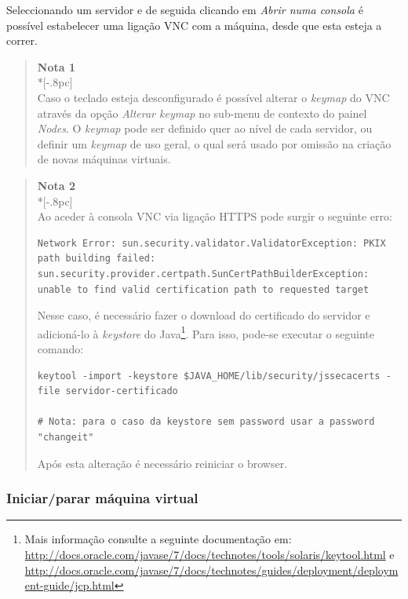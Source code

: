 Seleccionando um servidor e de seguida clicando em \emph{Abrir numa consola} é possível estabelecer uma ligação VNC com a máquina, desde que esta esteja a correr.

\begin{quote}
	{\large \bf Nota 1} \\*[-.8pc]
	\underline{\hspace{6in}} \\
	Caso o teclado esteja desconfigurado é possível alterar o \emph{keymap} do VNC através da opção \emph{Alterar keymap} no sub-menu de contexto do painel \emph{Nodes}.
    O \emph{keymap} pode ser definido quer ao nível de cada servidor, ou definir um \emph{keymap} de uso geral, o qual será usado por omissão na criação de novas máquinas virtuais.
\end{quote}

\begin{quote}
	{\large \bf Nota 2} \\*[-.8pc]
	\underline{\hspace{6in}} \\
    Ao aceder à consola VNC via ligação HTTPS pode surgir o seguinte erro:

\begin{verbatim}
Network Error: sun.security.validator.ValidatorException: PKIX path building failed: sun.security.provider.certpath.SunCertPathBuilderException: unable to find valid certification path to requested target
\end{verbatim}

    Nesse caso, é necessário fazer o download do certificado do servidor e adicioná-lo à \emph{keystore} do Java\footnote{Mais informação consulte a seguinte documentação em: \url{http://docs.oracle.com/javase/7/docs/technotes/tools/solaris/keytool.html} e \url{http://docs.oracle.com/javase/7/docs/technotes/guides/deployment/deployment-guide/jcp.html} }.
    Para isso, pode-se executar o seguinte comando:

\begin{verbatim}
keytool -import -keystore $JAVA_HOME/lib/security/jssecacerts -file servidor-certificado

# Nota: para o caso da keystore sem password usar a password "changeit"
\end{verbatim}

    Após esta alteração é necessário reiniciar o browser.

\end{quote}

\subsubsection{Iniciar/parar máquina virtual}
\label{sec:start_server}

